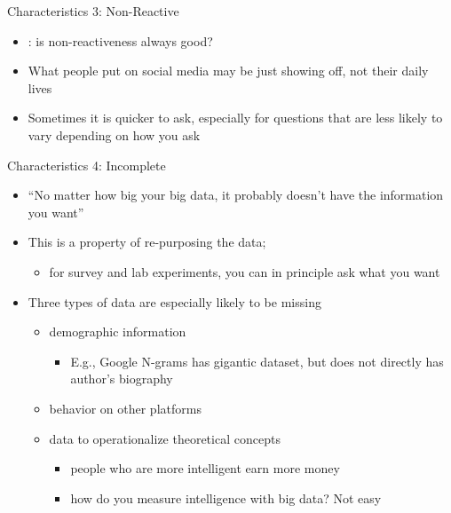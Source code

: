 \documentclass[handout]{beamer}
\begin{document}
\begin{frame}[label={h:12d58b4a-13cd-4805-bd80-22e6ef280ba1}]{Characteristics 3: Non-Reactive}
\begin{itemize}
\item{}: is non-reactiveness always good?
\item What people put on social media may be just showing off, not their daily lives
\item Sometimes it is quicker to ask, especially for questions that are less likely to vary depending on how you ask
\end{itemize}
\end{frame}

\begin{frame}[label={h:ff61aa6c-ed66-4933-8355-609cc1ccb2f0}]{Characteristics 4: Incomplete}
\begin{itemize}
\item ``No matter how big your big data, it probably doesn't have the information you want''
\item This is a property of \alert{re-purposing} the data; 
\begin{itemize}
\item for survey and lab experiments, you can in principle ask what you want
\end{itemize}
\item Three types of data are especially likely to be missing
\begin{itemize}
\item demographic information
\begin{itemize}
\item E.g., Google N-grams has gigantic dataset, but does not directly has author's biography
\end{itemize}
\item behavior on other platforms
\item data to operationalize theoretical concepts
\begin{itemize}
\item people who are more intelligent earn more money
\item how do you measure intelligence with big data? Not easy
\end{itemize}
\end{itemize}
\end{itemize}
\end{frame}
\end{document}
